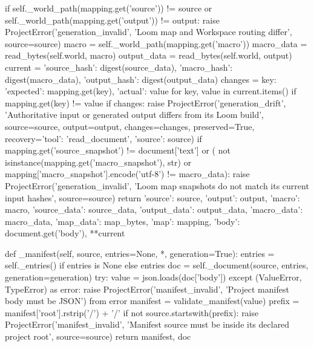        if self._world_path(mapping.get('source')) != source or self._world_path(mapping.get('output')) != output:
            raise ProjectError('generation_invalid', 'Loom map and Workspace routing differ', source=source)
        macro = self._world_path(mapping.get('macro'))
        macro_data = read_bytes(self.world, macro)
        output_data = read_bytes(self.world, output)
        current = {'source_hash': digest(source_data), 'macro_hash': digest(macro_data),
                   'output_hash': digest(output_data)}
        changes = {key: {'expected': mapping.get(key), 'actual': value}
                   for key, value in current.items() if mapping.get(key) != value}
        if changes:
            raise ProjectError('generation_drift', 'Authoritative input or generated output differs from its Loom build',
                               source=source, output=output, changes=changes, preserved=True,
                               recovery={'tool': 'read_document', 'source': source})
        if mapping.get('source_snapshot') != document['text'] or (
                not isinstance(mapping.get('macro_snapshot'), str) or
                mapping['macro_snapshot'].encode('utf-8') != macro_data):
            raise ProjectError('generation_invalid', 'Loom map snapshots do not match its current input hashes', source=source)
        return {'source': source, 'output': output, 'macro': macro,
                'source_data': source_data, 'output_data': output_data, 'macro_data': macro_data,
                'map_data': map_bytes, 'map': mapping, 'body': document.get('body'), **current}

    def _manifest(self, source, entries=None, *, generation=True):
        entries = self._entries() if entries is None else entries
        doc = self._document(source, entries, generation=generation)
        try:
            value = json.loads(doc['body'])
        except (ValueError, TypeError) as error:
            raise ProjectError('manifest_invalid', 'Project manifest body must be JSON') from error
        manifest = validate_manifest(value)
        prefix = manifest['root'].rstrip('/') + '/'
        if not source.startswith(prefix):
            raise ProjectError('manifest_invalid', 'Manifest source must be inside its declared project root', source=source)
        return manifest, doc

